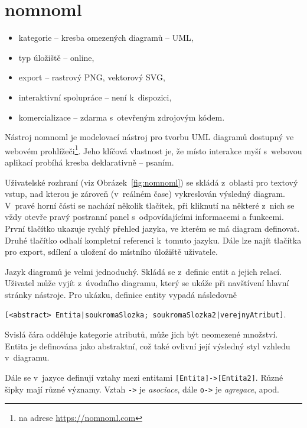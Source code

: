 \section{nomnoml}

\begin{itemize}
  \item kategorie -- kresba omezených diagramů -- UML,
  \item typ úložiště -- online,
  \item export -- rastrový PNG, vektorový SVG,
  \item interaktivní spolupráce -- není k~dispozici,
  \item komercializace -- zdarma s~otevřeným zdrojovým kódem.
\end{itemize}

Nástroj nomnoml je modelovací nástroj pro tvorbu UML diagramů dostupný ve webovém prohlížeči\footnote{na adrese \url{https://nomnoml.com}}.
Jeho klíčová vlastnost je, že místo interakce myší s~webovou aplikací probíhá kresba deklarativně -- psaním.

Uživatelské rozhraní (viz Obrázek~\ref{fig:nomnoml}) se skládá z~oblasti pro textový vstup, nad kterou je zároveň (v~reálném čase) vykreslován výsledný diagram.
V~pravé horní části se nachází několik tlačítek, při kliknutí na některé z~nich se vždy otevře pravý postranní panel s~odpovídajícími informacemi a funkcemi.
První tlačítko ukazuje rychlý přehled jazyka, ve kterém se má diagram definovat.
Druhé tlačítko odhalí kompletní referenci k~tomuto jazyku.
Dále lze najít tlačítka pro export, sdílení a uložení do místního úložiště uživatele.

Jazyk diagramů je velmi jednoduchý.
Skládá se z~definic entit a jejich relací.
Uživatel může vyjít z~úvodního diagramu, který se ukáže při navštívení hlavní stránky nástroje.
Pro ukázku, definice entity vypadá následovně

\noindent\texttt{[<abstract> Entita|soukromaSlozka; soukromaSlozka2|verejnyAtribut]}.

Svislá čára odděluje kategorie atributů, může jich být neomezené množství.
Entita je definována jako abstraktní, což také ovlivní její výsledný styl vzhledu v~diagramu.

Dále se v~jazyce definují vztahy mezi entitami \texttt{[Entita]->[Entita2]}.
Různé šipky mají různé významy.
Vztah \texttt{->} je \emph{asociace}, dále \texttt{o->} je \emph{agregace}, apod.


